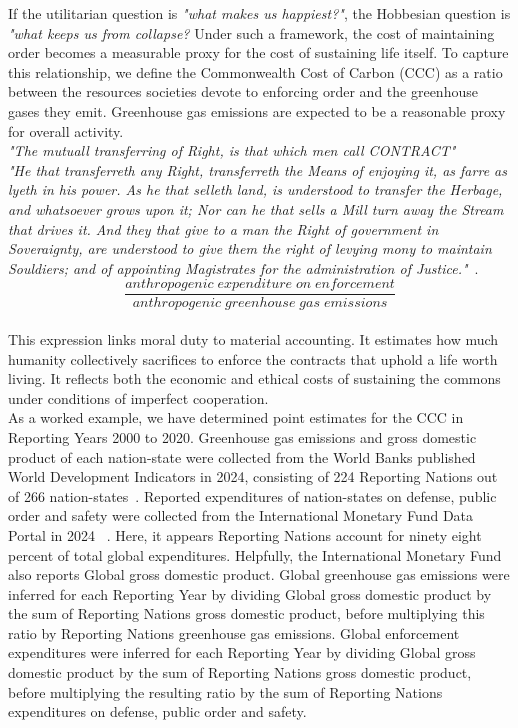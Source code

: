 If the utilitarian question is \emph{"what makes us happiest?"}, the Hobbesian question is \emph{"what keeps us from collapse?}
Under such a framework, the cost of maintaining order becomes a measurable proxy for the cost of sustaining life itself.
To capture this relationship, we define the Commonwealth Cost of Carbon (CCC) as a ratio between the resources societies devote to enforcing order and the greenhouse gases they emit.
Greenhouse gas emissions are expected to be a reasonable proxy for overall activity.\\

\emph{"The mutuall transferring of Right, is that which men call CONTRACT"}\\

\emph{"He that transferreth any Right, transferreth the Means of enjoying it, as farre as lyeth in his power.
As he that selleth land, is understood to transfer the Herbage, and whatsoever grows upon it; Nor can he that sells a Mill turn away the Stream that drives it.
And they that give to a man the Right of government in Soveraignty, are understood to give them the right of levying mony to maintain Souldiers; and of appointing Magistrates for the administration of Justice."}~\cite{th1}.\\

\begin{equation}
	\frac{anthropogenic\; expenditure\; on\; enforcement}{anthropogenic\; greenhouse\; gas\; emissions}
\end{equation}\\

This expression links moral duty to material accounting.
It estimates how much humanity collectively sacrifices to enforce the contracts that uphold a life worth living.
It reflects both the economic and ethical costs of sustaining the commons under conditions of imperfect cooperation.\\

As a worked example, we have determined point estimates for the CCC in Reporting Years 2000 to 2020.
Greenhouse gas emissions and gross domestic product of each nation-state were collected from the World Banks published World Development Indicators in 2024, consisting of 224 Reporting Nations out of 266 nation-states~\cite{wbank}.
Reported expenditures of nation-states on defense, public order and safety were collected from the International Monetary Fund Data Portal in 2024 ~\cite{imf}.
Here, it appears Reporting Nations account for ninety eight percent of total global expenditures.
Helpfully, the International Monetary Fund also reports Global gross domestic product.
Global greenhouse gas emissions were inferred for each Reporting Year by dividing Global gross domestic product by the sum of Reporting Nations gross domestic product, before multiplying this ratio by Reporting Nations greenhouse gas emissions.
Global enforcement expenditures were inferred for each Reporting Year by dividing Global gross domestic product by the sum of Reporting Nations gross domestic product, before multiplying the resulting ratio by the sum of Reporting Nations expenditures on defense, public order and safety.\\

